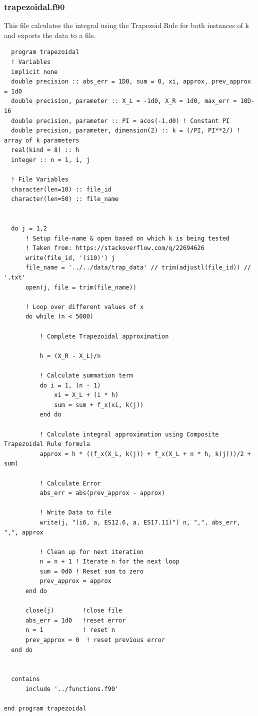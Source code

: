 \documentclass[12pt]{article}
\begin{document}
\subsubsection{trapezoidal.f90}
This file calculates the integral using the Trapezoid Rule for both instances of k and exports the
data to a file. 
\begin{verbatim}
  program trapezoidal
  ! Variables
  implicit none
  double precision :: abs_err = 1D0, sum = 0, xi, approx, prev_approx = 1d0
  double precision, parameter :: X_L = -1d0, X_R = 1d0, max_err = 10D-16
  double precision, parameter :: PI = acos(-1.d0) ! Constant PI 
  double precision, parameter, dimension(2) :: k = (/PI, PI**2/) ! array of k parameters
  real(kind = 8) :: h
  integer :: n = 1, i, j

  ! File Variables
  character(len=10) :: file_id
  character(len=50) :: file_name
  

  do j = 1,2
      ! Setup file-name & open based on which k is being tested
      ! Taken from: https://stackoverflow.com/q/22694626
      write(file_id, '(i10)') j
      file_name = '../../data/trap_data' // trim(adjustl(file_id)) // '.txt'
      open(j, file = trim(file_name))
      
      ! Loop over different values of x
      do while (n < 5000)

          ! Complete Trapezoidal approximation 

          h = (X_R - X_L)/n

          ! Calculate summation term
          do i = 1, (n - 1)
              xi = X_L + (i * h)
              sum = sum + f_x(xi, k(j))
          end do

          ! Calculate integral approximation using Composite Trapezoidal Rule formula
          approx = h * ((f_x(X_L, k(j)) + f_x(X_L + n * h, k(j)))/2 + sum)

          ! Calculate Error
          abs_err = abs(prev_approx - approx)
          
          ! Write Data to file
          write(j, "(i6, a, ES12.6, a, ES17.11)") n, ",", abs_err, ",", approx

          ! Clean up for next iteration
          n = n + 1 ! Iterate n for the next loop 
          sum = 0d0 ! Reset sum to zero
          prev_approx = approx
      end do
      
      close(j)        !close file
      abs_err = 1d0   !reset error
      n = 1           ! reset n
      prev_approx = 0  ! reset previous error
  end do

  
  contains
      include '../functions.f90'

end program trapezoidal
\end{verbatim}
\end{document}
